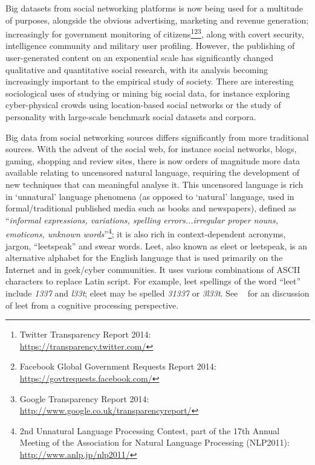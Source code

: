 \documentclass[letterpaper]{article}
\begin{document}
Big datasets from social networking platforms is now being used for a
multitude of purposes, alongside the obvious advertising, marketing
and revenue generation; increasingly for government monitoring of
citizens\footnote{Twitter Transparency Report 2014:\\
\url{https://transparency.twitter.com/}}\footnote{Facebook Global
Government Requests Report
2014:\\\url{https://govtrequests.facebook.com/}}\footnote{Google
Transparency Report
2014:\\\url{http://www.google.co.uk/transparencyreport/}}, along with
covert security, intelligence community and military user profiling.
However, the publishing of user-generated content on an exponential
scale has significantly changed qualitative and quantitative social
research, with its analysis becoming increasingly important to the
empirical study of society. There are interesting sociological uses of
studying or mining big social data, for instance exploring
cyber-physical crowds using location-based social networks or the
study of personality with large-scale benchmark social datasets and
corpora.

Big data from social networking sources differs significantly from
more traditional sources.  With the advent of the social web, for
instance social networks, blogs, gaming, shopping and review sites,
there is now orders of magnitude more data available relating to
uncensored natural language, requiring the development of new
techniques that can meaningful analyse it. This uncensored language is
rich in `unnatural' language phenomena (as opposed to `natural'
language, used in formal/traditional published media such as books and
newspapers), defined as ``{\emph{informal expressions, variations,
spelling errors...irregular proper nouns, emoticons, unknown
words}}''\footnote{2nd Unnatural Language Processing Contest, part of
the 17th Annual Meeting of the Association for Natural Language
Processing (NLP2011): \url{http://www.anlp.jp/nlp2011/}}; it is also
rich in context-dependent acronyms, jargon, ``leetspeak'' and swear
words. Leet, also known as eleet or leetspeak, is an alternative
alphabet for the English language that is used primarily on the
Internet and in geek/cyber communities. It uses various combinations
of ASCII characters to replace Latin script. For example, leet
spellings of the word ``leet'' include {\emph{1337}} and
{\emph{l33t}}; eleet may be spelled {\emph{31337}} or
{\emph{3l33t}}. See
\citeauthor{perea-et-al:2008}~ for an
discussion of leet from a cognitive processing perspective.
\end{document}
